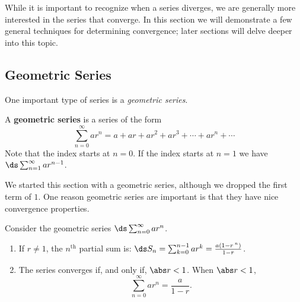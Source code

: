 While it is important to recognize when a series diverges, we are generally more interested in the series that  converge. In this section we will demonstrate a few general techniques for determining convergence; later sections will delve deeper into this topic.

\subsection{Geometric Series}

One important type of series is a \emph{geometric series}.

\begin{definition}\label{def:geom_series}
A \textbf{geometric series} is a series of the form 
\[\sum_{n=0}^\infty ar^n = a+ar+ar^2+ar^3+\dotsb+ar^n+\dotsb\]
Note that the index starts at $n=0$. If the index starts at $n=1$ we have $\ds \sum_{n=1}^\infty ar^{n-1}$.%
\end{definition}

We started this section with a geometric series, although we dropped the first term of $1$. One reason geometric series are important is that they have nice convergence properties.

\clearpage
\begin{theorem}\label{thm:geom_series}
Consider the geometric series $\ds \sum_{n=0}^\infty ar^n$.\vspace{-.5\baselineskip}
\begin{enumerate}
\item	If $r\neq1$, the $n^\text{th}$ partial sum is: $\ds S_n = \sum_{k=0}^{n-1}ar^k=\frac{a(1-r\,^n)}{1-r}$.
\item	The series converges if, and only if, $\abs r<1$. When $\abs r<1$, 
\[\sum_{n=0}^\infty ar^n = \frac{a}{1-r}.\]
\end{enumerate}
\end{theorem}

